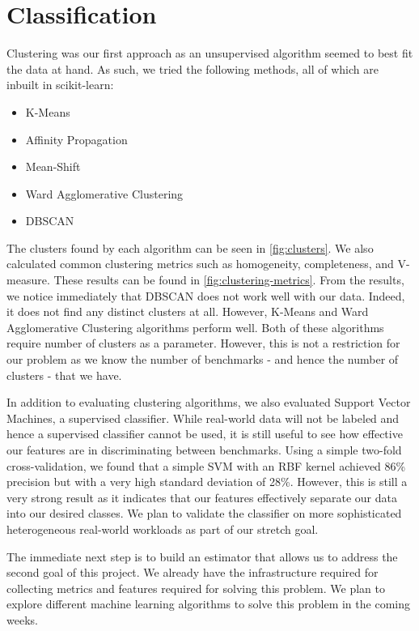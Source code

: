 \section{Classification} \label{sec:classfication}

Clustering was our first approach as an unsupervised algorithm seemed
to best fit the data at hand. As such, we tried the following methods,
all of which are inbuilt in scikit-learn:\\

\begin{itemize}
\item K-Means
\item Affinity Propagation
\item Mean-Shift
\item Ward Agglomerative Clustering
\item DBSCAN
\end{itemize}

The clusters found by each algorithm can be seen in
\cref{fig:clusters}. We also calculated common clustering metrics such
as homogeneity, completeness, and V-measure. These results can be
found in \cref{fig:clustering-metrics}. From the results, we notice
immediately that DBSCAN does not work well with our data. Indeed, it
does not find any distinct clusters at all. However, K-Means and Ward
Agglomerative Clustering algorithms perform well. 
Both of these algorithms require number of clusters as a 
parameter. 
However, this is not a restriction for our problem as we
know the number of benchmarks - and hence the number of clusters -
that we have.

In addition to evaluating clustering algorithms, we also evaluated
Support Vector Machines, a supervised classifier. While real-world
data will not be labeled and hence a supervised classifier cannot be
used, it is still useful to see how effective our features are in
discriminating between benchmarks. Using a simple two-fold
cross-validation, we found that a simple SVM with an RBF kernel
achieved 86\% precision but with a very high standard deviation of
28\%. However, this is still a very strong result as it indicates that
our features effectively separate our data into our desired
classes. 
We plan to validate the classifier on more sophisticated heterogeneous 
real-world workloads as part of our stretch goal.

The immediate next step is to build an estimator that allows us to address the
second goal of this project. We already have the infrastructure required
for collecting metrics and features required for solving this problem.
We plan to explore different machine learning algorithms to solve this
problem in the coming weeks.

